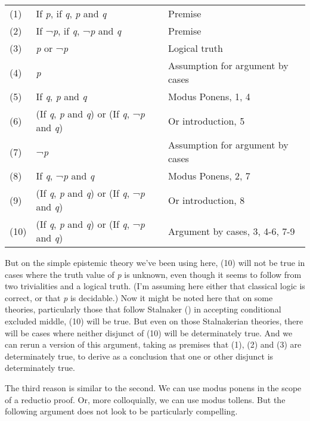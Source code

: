 \documentclass[
  10pt,
  letterpaper,
  DIV=11,
  numbers=noendperiod,
  twoside]{scrartcl}
\begin{document}
\begin{longtable}[]{@{}
  >{\raggedleft\arraybackslash}p{}
  >{\raggedright\arraybackslash}p{}
  >{\raggedright\arraybackslash}p{}@{}}
\toprule\noalign{}
\endhead
\bottomrule\noalign{}
\endlastfoot
(1) & If \emph{p}, if \emph{q}, \emph{p} and \emph{q} & Premise \\
(2) & If ¬\emph{p}, if \emph{q}, ¬\emph{p} and \emph{q} & Premise \\
(3) & \emph{p} or ¬\emph{p} & Logical truth \\
(4) & \emph{p} & Assumption for argument by cases \\
(5) & If \emph{q}, \emph{p} and \emph{q} & Modus Ponens, 1, 4 \\
(6) & (If \emph{q}, \emph{p} and \emph{q}) or (If \emph{q}, ¬\emph{p}
and \emph{q}) & Or introduction, 5 \\
(7) & ¬\emph{p} & Assumption for argument by cases \\
(8) & If \emph{q}, ¬\emph{p} and \emph{q} & Modus Ponens, 2, 7 \\
(9) & (If \emph{q}, \emph{p} and \emph{q}) or (If \emph{q}, ¬\emph{p}
and \emph{q}) & Or introduction, 8 \\
(10) & (If \emph{q}, \emph{p} and \emph{q}) or (If \emph{q}, ¬\emph{p}
and \emph{q}) & Argument by cases, 3, 4-6, 7-9 \\
\end{longtable}

But on the simple epistemic theory we've been using here, (10) will not
be true in cases where the truth value of \emph{p} is unknown, even
though it seems to follow from two trivialities and a logical truth.
(I'm assuming here either that classical logic is correct, or that
\emph{p} is decidable.) Now it might be noted here that on some
theories, particularly those that follow Stalnaker
() in accepting conditional excluded
middle, (10) will be true. But even on those Stalnakerian theories,
there will be cases where neither disjunct of (10) will be determinately
true. And we can rerun a version of this argument, taking as premises
that (1), (2) and (3) are determinately true, to derive as a conclusion
that one or other disjunct is determinately true.

The third reason is similar to the second. We can use modus ponens in
the scope of a reductio proof. Or, more colloquially, we can use modus
tollens. But the following argument does not look to be particularly
compelling.
\end{document}
